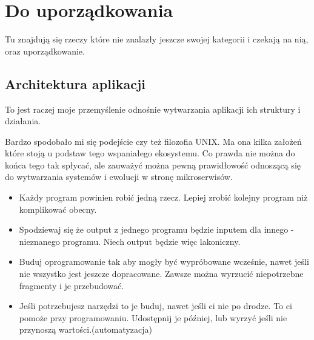 \chapter{Do uporządkowania}
Tu znajdują się rzeczy które nie znalazły jeszcze swojej kategorii i czekają na nią, oraz uporządkowanie.


\section{Architektura aplikacji}
To jest raczej moje przemyślenie odnośnie wytwarzania aplikacji ich struktury i działania.

Bardzo spodobało mi się podejście czy też filozofia UNIX. Ma ona kilka założeń które stoją u podstaw tego wspaniałego ekosystemu.
Co prawda nie można do końca tego tak spłycać, ale zauważyć można pewną prawidłowość odnoszącą się do wytwarzania systemów i ewolucji w stronę mikroserwisów.

	\begin{itemize}
		\item Każdy program powinien robić jedną rzecz. Lepiej zrobić kolejny program niż komplikować obecny.
		\item Spodziewaj się że output z jednego programu będzie inputem dla innego - nieznanego programu. Niech output będzie więc lakoniczny.
		\item Buduj oprogramowanie tak aby mogły być wypróbowane wcześnie, nawet jeśli nie wszystko jest jeszcze dopracowane. Zawsze można wyrzucić niepotrzebne fragmenty i je przebudować.
		\item Jeśli potrzebujesz narzędzi to je buduj, nawet jeśli ci nie po drodze. To ci pomoże przy programowaniu. Udostępnij je później, lub wyrzyć jeśli nie przynoszą wartości.(automatyzacja)
	\end{itemize}
